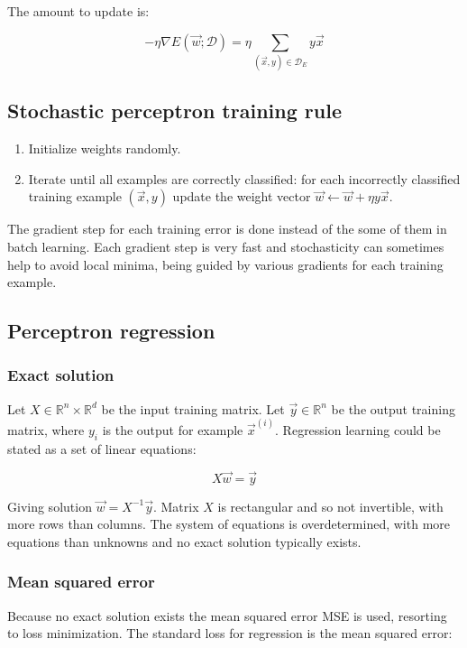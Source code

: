 	The amount to update is:

	$$-\eta\nabla E(\vec{w};\mathcal{D}) = \eta\sum\limits_{(\vec{x}, y)\in\mathcal{D}_E}y\vec{x}$$

	\subsection{Stochastic perceptron training rule}

	\begin{multicols}{2}
		\begin{enumerate}
			\item Initialize weights randomly.
			\item Iterate until all examples are correctly classified: for each incorrectly classified training example $(\vec{x}, y)$ update the weight vector $\vec{w}\leftarrow \vec{w}+\eta y\vec{x}$.
		\end{enumerate}
	\end{multicols}

	The gradient step for each training error is done instead of the some of them in batch learning.
	Each gradient step is very fast and stochasticity can sometimes help to avoid local minima, being guided by various gradients for each training example.

	\subsection{Perceptron regression}

		\subsubsection{Exact solution}
		Let $X\in\mathbb{R}^n\times\mathbb{R}^d$ be the input training matrix.
		Let $\vec{y}\in\mathbb{R}^n$ be the output training matrix, where $y_i$ is the output for example $\vec{x}^{(i)}$.
		Regression learning could be stated as a set of linear equations:

		$$X\vec{w} = \vec{y}$$

		Giving solution $\vec{w} = X^{-1}\vec{y}$.
		Matrix $X$ is rectangular and so not invertible, with more rows than columns.
		The system of equations is overdetermined, with more equations than unknowns and no exact solution typically exists.

		\subsubsection{Mean squared error}
		Because no exact solution exists the mean squared error MSE is used, resorting to loss minimization.
		The standard loss for regression is the mean squared error:

